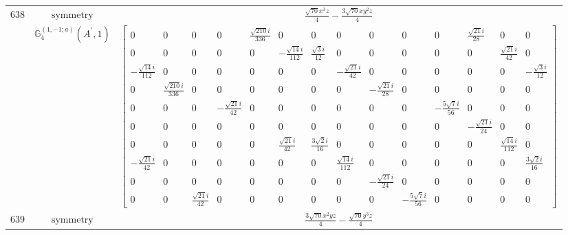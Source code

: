 \documentclass[fleqn,8pt,landscape]{jsarticle}
\begin{document}
\begin{longtable}{ccc}
$ 638 $ & $ \text{symmetry} $ & $ \frac{\sqrt{70} x^{3} z}{4} - \frac{3 \sqrt{70} x y^{2} z}{4} $ \\
$  $ & $ \mathbb{G}_{4}^{(1,-1;a)}(A^{\prime},1) $ & $ \begin{bmatrix} 0 & 0 & 0 & 0 & \frac{\sqrt{210} i}{336} & 0 & 0 & 0 & 0 & 0 & 0 & \frac{\sqrt{21} i}{28} & 0 & 0 \\ 0 & 0 & 0 & 0 & 0 & - \frac{\sqrt{14} i}{112} & \frac{\sqrt{3} i}{12} & 0 & 0 & 0 & 0 & 0 & \frac{\sqrt{21} i}{42} & 0 \\ - \frac{\sqrt{14} i}{112} & 0 & 0 & 0 & 0 & 0 & 0 & - \frac{\sqrt{21} i}{42} & 0 & 0 & 0 & 0 & 0 & - \frac{\sqrt{3} i}{12} \\ 0 & \frac{\sqrt{210} i}{336} & 0 & 0 & 0 & 0 & 0 & 0 & - \frac{\sqrt{21} i}{28} & 0 & 0 & 0 & 0 & 0 \\ 0 & 0 & 0 & - \frac{\sqrt{21} i}{42} & 0 & 0 & 0 & 0 & 0 & 0 & - \frac{5 \sqrt{7} i}{56} & 0 & 0 & 0 \\ 0 & 0 & 0 & 0 & 0 & 0 & 0 & 0 & 0 & 0 & 0 & - \frac{\sqrt{21} i}{24} & 0 & 0 \\ 0 & 0 & 0 & 0 & 0 & \frac{\sqrt{21} i}{42} & \frac{3 \sqrt{2} i}{16} & 0 & 0 & 0 & 0 & 0 & \frac{\sqrt{14} i}{112} & 0 \\ - \frac{\sqrt{21} i}{42} & 0 & 0 & 0 & 0 & 0 & 0 & \frac{\sqrt{14} i}{112} & 0 & 0 & 0 & 0 & 0 & \frac{3 \sqrt{2} i}{16} \\ 0 & 0 & 0 & 0 & 0 & 0 & 0 & 0 & - \frac{\sqrt{21} i}{24} & 0 & 0 & 0 & 0 & 0 \\ 0 & 0 & \frac{\sqrt{21} i}{42} & 0 & 0 & 0 & 0 & 0 & 0 & - \frac{5 \sqrt{7} i}{56} & 0 & 0 & 0 & 0 \end{bmatrix} $ \\ \hline
$ 639 $ & $ \text{symmetry} $ & $ \frac{3 \sqrt{70} x^{2} y z}{4} - \frac{\sqrt{70} y^{3} z}{4} $ \\

\end{longtable}
\end{document}
